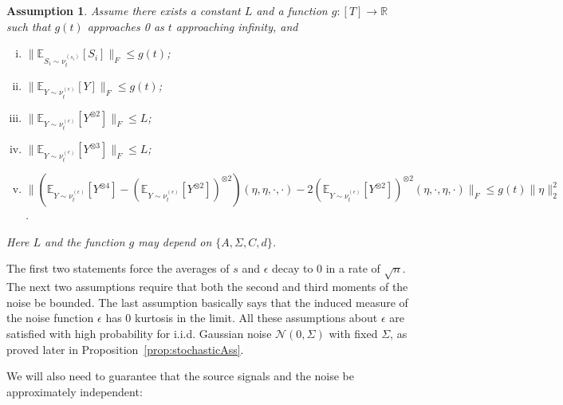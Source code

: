 \documentclass[twoside,11pt]{article}
\newcommand{\E}{\mathbb{E}}
\newcommand{\real}{\mathbb{R}}
\newcommand{\iid}{i.i.d.\xspace}
\newtheorem{assumption}{Assumption}
\begin{document}
\begin{assumption}
\label{ass:gauss}
Assume there exists a constant $L$ and a function $g:[T]\rightarrow \real$ such that $g(t)$ approaches 0 as $t$ approaching infinity, and
\begin{enumerate}[(i)]
\item $\| \E_{S_i\sim \nu_t^{(s_i)}} [S_i] \|_F\le g(t)$; %
\item $\| \E_{Y \sim \nu_t^{(\epsilon)}} [Y] \|_F \le g(t)$; %
\item $\| \E_{Y\sim \nu_t^{(\epsilon)}} [Y^{\otimes 2}] \|_F \le L$;
\item $\| \E_{Y\sim \nu_t^{(\epsilon)}} [Y^{\otimes 3}] \|_F \le L$;
\item $\| \left(\E_{Y\sim \nu_t^{(\epsilon)}} [Y^{\otimes4}] - (\E_{Y\sim \nu_t^{(\epsilon)}} [Y^{\otimes2}])^{\otimes 2}\right)(\eta,\eta,\cdot,\cdot)  - 2 (\E_{Y\sim \nu_t^{(\epsilon)}} [Y^{\otimes2}])^{\otimes 2}(\eta,\cdot,\eta,\cdot)\|_F\le g(t)\|\eta\|_2^2$. %
\end{enumerate}
Here $L$ and the function $g$ may depend on $\{A,\Sigma,C,d\}$.
\end{assumption}
\begin{remark}
The first two statements force the averages of $s$ and $\epsilon$ decay to 0 in a rate of $\sqrt{n}$.
The next two assumptions require that both the second and third moments of the noise be bounded.
The last assumption basically says that the induced measure of the noise function $\epsilon$ has 0 kurtosis in the limit.
All these assumptions about $\epsilon$ are satisfied with high probability for \iid Gaussian noise $\mathcal{N}(0,\Sigma)$ with fixed $\Sigma$, as proved later in Proposition~\ref{prop:stochasticAss}.
\end{remark}
We will also need to guarantee that the source signals and the noise be approximately independent:
\end{document}
